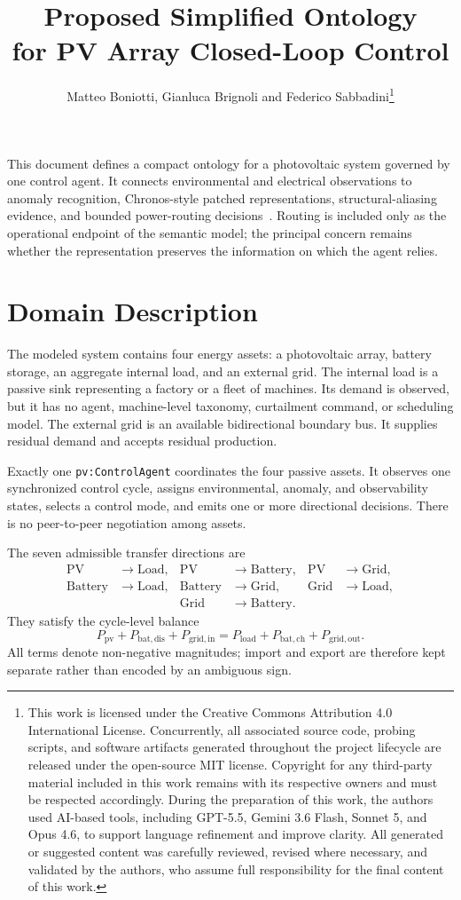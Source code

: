 \documentclass[
	letterpaper,
	10pt,
	unnumberedsections,
	twoside,
]{LTJournalArticle}
\title{Proposed Simplified Ontology\\for PV Array Closed-Loop Control}
\author{
	Matteo Boniotti, Gianluca Brignoli and Federico Sabbadini\thanks{This work is licensed under the Creative Commons Attribution 4.0 International License. Concurrently, all associated source code, probing scripts, and software artifacts generated throughout the project lifecycle are released under the open-source MIT license. \newline Copyright for any third-party material included in this work remains with its respective owners and must be respected accordingly. \newline \newline During the preparation of this work, the authors used AI-based tools, including GPT-5.5, Gemini 3.6 Flash, Sonnet 5, and Opus 4.6, to support language refinement and improve clarity. All generated or suggested content was carefully reviewed, revised where necessary, and validated by the authors, who assume full responsibility for the final content of this work.}
}
\newcommand{\pv}[1]{\texttt{pv:#1}}
\begin{document}
\maketitle

This document defines a compact ontology for a photovoltaic system governed by one control agent. It connects environmental and electrical observations to anomaly recognition, Chronos-style patched representations, structural-aliasing evidence, and bounded power-routing decisions~\cite{ansariChronosLearningLanguage2024}. Routing is included only as the operational endpoint of the semantic model; the principal concern remains whether the representation preserves the information on which the agent relies.

\section{Domain Description}

The modeled system contains four energy assets: a photovoltaic array, battery storage, an aggregate internal load, and an external grid. The internal load is a passive sink representing a factory or a fleet of machines. Its demand is observed, but it has no agent, machine-level taxonomy, curtailment command, or scheduling model. The external grid is an available bidirectional boundary bus. It supplies residual demand and accepts residual production.

Exactly one \pv{ControlAgent} coordinates the four passive assets. It observes one synchronized control cycle, assigns environmental, anomaly, and observability states, selects a control mode, and emits one or more directional decisions. There is no peer-to-peer negotiation among assets.

The seven admissible transfer directions are
\begin{equation}
\label{eq:routes}
\begin{aligned}
\mathrm{PV}&\rightarrow\mathrm{Load}, &
\mathrm{PV}&\rightarrow\mathrm{Battery}, &
\mathrm{PV}&\rightarrow\mathrm{Grid},\\
\mathrm{Battery}&\rightarrow\mathrm{Load}, &
\mathrm{Battery}&\rightarrow\mathrm{Grid}, &
\mathrm{Grid}&\rightarrow\mathrm{Load},\\
&&\mathrm{Grid}&\rightarrow\mathrm{Battery}.&&
\end{aligned}
\end{equation}
They satisfy the cycle-level balance
\begin{equation}
\label{eq:power-balance}
P_{\mathrm{pv}}+P_{\mathrm{bat,dis}}+P_{\mathrm{grid,in}}
=P_{\mathrm{load}}+P_{\mathrm{bat,ch}}+P_{\mathrm{grid,out}}.
\end{equation}
All terms denote non-negative magnitudes; import and export are therefore kept separate rather than encoded by an ambiguous sign.
\end{document}
